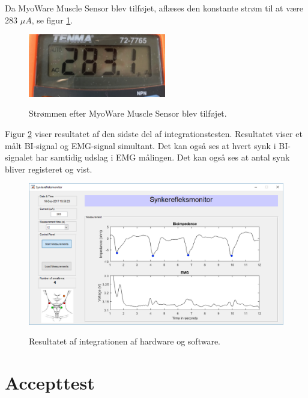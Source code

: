 Da MyoWare Muscle Sensor blev tilføjet, aflæses den konstante strøm til at være 283 $\mu A$, se figur \ref{fig:integrationstestVCCSud2}.

 

\begin{figure}[H] 
\centering
{\includegraphics[width=6cm]
{Figure/integrationstestVCCSud}}
\caption{Strømmen efter MyoWare Muscle Sensor blev tilføjet.}
\label{fig:integrationstestVCCSud2}
\end{figure}

Figur \ref{fig:guiDone} viser resultatet af den sidste del af integrationstesten. Resultatet viser et målt BI-signal og EMG-signal simultant. Det kan også ses at hvert synk i BI-signalet har samtidig udslag i EMG målingen. Det kan også ses at antal synk bliver registeret og vist. 

\begin{figure}[H] 
\centering
{\includegraphics[width=\linewidth]
{Figure/guiDone}}
\caption{Resultatet af integrationen af hardware og software.}
\label{fig:guiDone}
\end{figure}

\pagebreak

\section{Accepttest}
